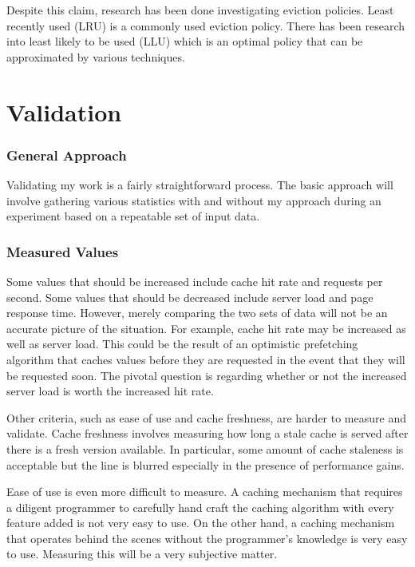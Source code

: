 \documentclass[12pt]{ucthesis}
\begin{document}
Despite this claim, research has been done investigating eviction policies.
Least recently used (LRU) is a commonly used eviction policy.
There has been research into least likely to be used (LLU) which is an optimal policy that can be approximated by various techniques.

\chapter{Validation}
\label{validation}

\subsection{General Approach}
Validating my work is a fairly straightforward process.
The basic approach will involve gathering various statistics with and without my approach during an experiment based on a repeatable set of input data. %

\subsection{Measured Values}
Some values that should be increased include cache hit rate and requests per second.
Some values that should be decreased include server load and page response time.
However, merely comparing the two sets of data will not be an accurate picture of the situation.
For example, cache hit rate may be increased as well as server load.
This could be the result of an optimistic prefetching algorithm that caches values before they are requested in the event that they will be requested soon.
The pivotal question is regarding whether or not the increased server load is worth the increased hit rate.

Other criteria, such as ease of use and cache freshness, are harder to measure and validate.
Cache freshness involves measuring how long a stale cache is served after there is a fresh version available.
In particular, some amount of cache staleness is acceptable but the line is blurred especially in the presence of performance gains.

Ease of use is even more difficult to measure.
A caching mechanism that requires a diligent programmer to carefully hand craft the caching algorithm with every feature added is not very easy to use.
On the other hand, a caching mechanism that operates behind the scenes without the programmer's knowledge is very easy to use.
Measuring this will be a very subjective matter.
\end{document}
